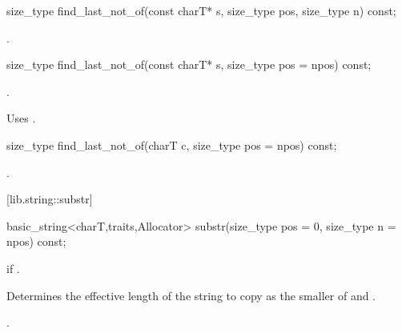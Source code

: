 %
%
\begin{itemdecl}
size_type find_last_not_of(const charT* s, size_type pos,
                           size_type n) const;
\end{itemdecl}

\begin{itemdescr}
\pnum
\returns
{}.
\end{itemdescr}

%
%
\begin{itemdecl}
size_type find_last_not_of(const charT* s, size_type pos = npos) const;
\end{itemdecl}

\begin{itemdescr}
\pnum
\returns
{}.

\pnum
\notes
Uses .
\end{itemdescr}

%
%
\begin{itemdecl}
size_type find_last_not_of(charT c, size_type pos = npos) const;
\end{itemdecl}

\begin{itemdescr}
\pnum
\returns
{}.
\end{itemdescr}

[lib.string::substr]{}

%
%
\begin{itemdecl}
basic_string<charT,traits,Allocator>
  substr(size_type pos = 0, size_type n = npos) const;
\end{itemdecl}

\begin{itemdescr}
\pnum
\requires
{}

\pnum
\throws
{}
if
.

\pnum
\effects
Determines the effective length  of the string to copy as the smaller of  and
.

\pnum
\returns
{}.
\end{itemdescr}

